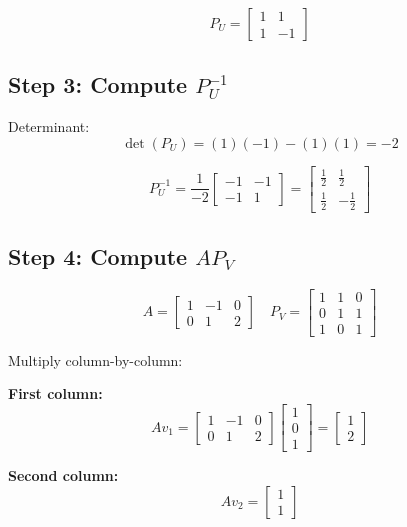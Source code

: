 \documentclass[11pt]{article}
\begin{document}
\[
P_U =
\begin{bmatrix}
1 & 1 \\
1 & -1
\end{bmatrix}
\]

\subsection*{Step 3: Compute $P_U^{-1}$}

Determinant:
\[
\det(P_U) = (1)(-1) - (1)(1) = -2
\]

\[
P_U^{-1}
=
\frac{1}{-2}
\begin{bmatrix}
-1 & -1 \\
-1 & 1
\end{bmatrix}
=
\begin{bmatrix}
\frac{1}{2} & \frac{1}{2} \\
\frac{1}{2} & -\frac{1}{2}
\end{bmatrix}
\]

\hrulefill

\subsection*{Step 4: Compute $A P_V$}

\[
A =
\begin{bmatrix}
1 & -1 & 0 \\
0 & 1 & 2
\end{bmatrix}
\quad
P_V =
\begin{bmatrix}
1 & 1 & 0 \\
0 & 1 & 1 \\
1 & 0 & 1
\end{bmatrix}
\]

Multiply column-by-column:

\textbf{First column:}
\[
A v_1 =
\begin{bmatrix}
1 & -1 & 0 \\
0 & 1 & 2
\end{bmatrix}
\begin{bmatrix}
1 \\ 0 \\ 1
\end{bmatrix}
=
\begin{bmatrix}
1 \\
2
\end{bmatrix}
\]

\textbf{Second column:}
\[
A v_2 =
\begin{bmatrix}
1 \\ 1
\end{bmatrix}
\]
\end{document}
